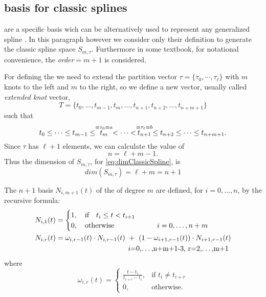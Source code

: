\documentclass[dissertation.tex]{subfiles}
\begin{document}
\subsection{\bss basis for classic
  splines}\label{sec:bsplines}\index{\bss}
\emph{\bss} are a specific basis wich can be alternatively used to
represent any generalized spline \cite{deboor}\cite{farin}\cite{salomon}\cite{bartels}. In this
paragraph however we consider only their definition to generate the
classic spline space $S_{m,\tau}$. Furthermore in some textbook, for
notational convenience, the
\emph{order}$=m+1$ is considered.

For defining the \bss \cite{deboor} we need to extend the partition vector
$\tau=\{\tau_0,\cdots,\tau_\ell\}$ with $m$ knots to the left and $m$ to
the right, so we define a new vector, usually called \emph{extended knot} vector,
$$
T=\{t_0,\dots,t_{m-1},t_{m},\dots,t_{n+1},t_{n+2},\dots,t_{n+m+1}\}
$$
such that
\begin{equation*}
  t_0\leq\dots\leq t_{m-1}\leq \stackrel{\equiv\tau_0\equiv a}{t_{m}}<\dots<\stackrel{\equiv\tau_\ell\equiv b}{t_{n+1}}\leq t_{n+2}\leq\dots\leq t_{n+m+1}.    
\end{equation*}
Since $\tau$ has $\ell+1$ elements, we can calculate the value of
$$
n=\ell+m-1.
$$
Thus the dimension of $S_{m,\tau}$, for
\cref{eq:dimClassicSpline}, is 
\begin{equation*}
  dim(S_{m,\tau})=\ell+m=n+1  
\end{equation*}

The $n+1$ basis $N_{i,m+1}(t)$ of the \bss of degree $m$ are defined,
for $i=0,\dots,n$, by the recursive formula:
\begin{align*}
  N_{i,1}(t) &=
  \begin{cases}
    1,\quad \mbox{if}\quad t_i\leq t<t_{i+1}\\
    0,\quad \mbox{otherwise}\qquad\qquad\qquad i=0,\dots,n+m
  \end{cases}\\
  N_{i,r}(t) &= \omega_{i,r-1}(t)\cdot N_{i,r-1}(t)\ +\
  (1-\omega_{i+1,r-1}(t))\cdot N_{i+1,r-1}(t)\\
             &\pushright i=0,\dots,n+m+1-3,\ r=2,\dots,m+1
\end{align*}
where
$$
\omega_{i,r}(t) = \begin{cases}
  \frac{t-t_i}{t_{i+r}-t_i},&\mbox{if }t_i\neq t_{i+r}\\
  0, &\mbox{otherwise.}
\end{cases}
$$
\end{document}
